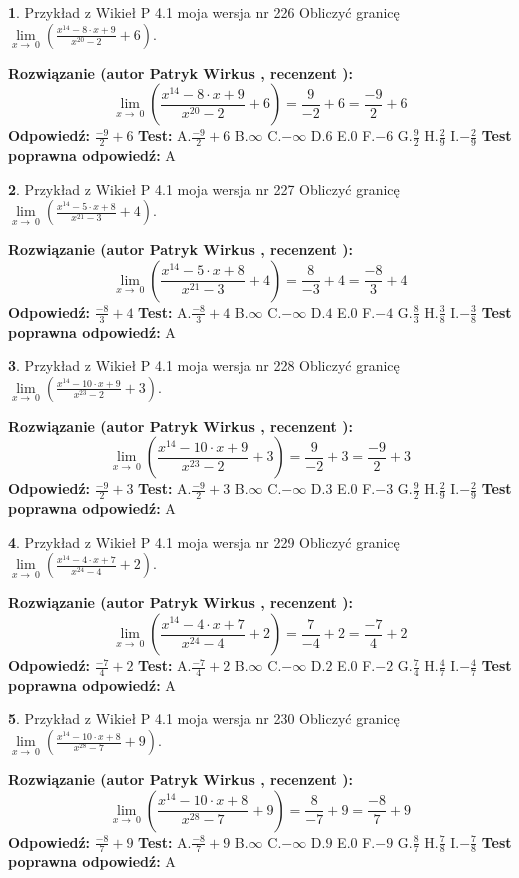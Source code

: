 \documentclass[12pt, a4paper]{article}
\theoremstyle{definition} %
\newtheorem{zad}{}
\newcommand{\zadStart}[1]{\begin{zad}#1\newline}
\newcommand{\zadStop}{\end{zad}}
\newcommand{\rozwStart}[2]{\noindent \textbf{Rozwiązanie (autor #1 , recenzent #2): }\newline}
\newcommand{\rozwStop}{\newline}
\newcommand{\odpStart}{\noindent \textbf{Odpowiedź:}\newline}
\newcommand{\odpStop}{\newline}
\newcommand{\testStart}{\noindent \textbf{Test:}\newline}
\newcommand{\testStop}{\newline}
\newcommand{\kluczStart}{\noindent \textbf{Test poprawna odpowiedź:}\newline}
\newcommand{\kluczStop}{\newline}
\begin{document}
\zadStart{Przykład z Wikieł P 4.1 moja wersja nr 226}
Obliczyć granicę $\lim\limits_{x\to\ 0}(\frac{x^{14}-8 \cdot x +9}{x^{20}-2}+6)$.
\zadStop
\rozwStart{Patryk Wirkus}{}
$$\lim\limits_{x\to\ 0}(\frac{x^{14}-8 \cdot x +9}{x^{20}-2}+6)=\frac{9}{-2}+6=\frac{-9}{2}+6$$
\rozwStop
\odpStart
$\frac{-9}{2}+6$
\odpStop
\testStart
A.$\frac{-9}{2}+6$
B.$\infty$
C.$-\infty$
D.$6$
E.$0$
F.$-6$
G.$\frac{9}{2}$
H.$\frac{2}{9}$
I.$-\frac{2}{9}$
\testStop
\kluczStart
A
\kluczStop



\zadStart{Przykład z Wikieł P 4.1 moja wersja nr 227}
Obliczyć granicę $\lim\limits_{x\to\ 0}(\frac{x^{14}-5 \cdot x +8}{x^{21}-3}+4)$.
\zadStop
\rozwStart{Patryk Wirkus}{}
$$\lim\limits_{x\to\ 0}(\frac{x^{14}-5 \cdot x +8}{x^{21}-3}+4)=\frac{8}{-3}+4=\frac{-8}{3}+4$$
\rozwStop
\odpStart
$\frac{-8}{3}+4$
\odpStop
\testStart
A.$\frac{-8}{3}+4$
B.$\infty$
C.$-\infty$
D.$4$
E.$0$
F.$-4$
G.$\frac{8}{3}$
H.$\frac{3}{8}$
I.$-\frac{3}{8}$
\testStop
\kluczStart
A
\kluczStop



\zadStart{Przykład z Wikieł P 4.1 moja wersja nr 228}
Obliczyć granicę $\lim\limits_{x\to\ 0}(\frac{x^{14}-10 \cdot x +9}{x^{23}-2}+3)$.
\zadStop
\rozwStart{Patryk Wirkus}{}
$$\lim\limits_{x\to\ 0}(\frac{x^{14}-10 \cdot x +9}{x^{23}-2}+3)=\frac{9}{-2}+3=\frac{-9}{2}+3$$
\rozwStop
\odpStart
$\frac{-9}{2}+3$
\odpStop
\testStart
A.$\frac{-9}{2}+3$
B.$\infty$
C.$-\infty$
D.$3$
E.$0$
F.$-3$
G.$\frac{9}{2}$
H.$\frac{2}{9}$
I.$-\frac{2}{9}$
\testStop
\kluczStart
A
\kluczStop



\zadStart{Przykład z Wikieł P 4.1 moja wersja nr 229}
Obliczyć granicę $\lim\limits_{x\to\ 0}(\frac{x^{14}-4 \cdot x +7}{x^{24}-4}+2)$.
\zadStop
\rozwStart{Patryk Wirkus}{}
$$\lim\limits_{x\to\ 0}(\frac{x^{14}-4 \cdot x +7}{x^{24}-4}+2)=\frac{7}{-4}+2=\frac{-7}{4}+2$$
\rozwStop
\odpStart
$\frac{-7}{4}+2$
\odpStop
\testStart
A.$\frac{-7}{4}+2$
B.$\infty$
C.$-\infty$
D.$2$
E.$0$
F.$-2$
G.$\frac{7}{4}$
H.$\frac{4}{7}$
I.$-\frac{4}{7}$
\testStop
\kluczStart
A
\kluczStop



\zadStart{Przykład z Wikieł P 4.1 moja wersja nr 230}
Obliczyć granicę $\lim\limits_{x\to\ 0}(\frac{x^{14}-10 \cdot x +8}{x^{28}-7}+9)$.
\zadStop
\rozwStart{Patryk Wirkus}{}
$$\lim\limits_{x\to\ 0}(\frac{x^{14}-10 \cdot x +8}{x^{28}-7}+9)=\frac{8}{-7}+9=\frac{-8}{7}+9$$
\rozwStop
\odpStart
$\frac{-8}{7}+9$
\odpStop
\testStart
A.$\frac{-8}{7}+9$
B.$\infty$
C.$-\infty$
D.$9$
E.$0$
F.$-9$
G.$\frac{8}{7}$
H.$\frac{7}{8}$
I.$-\frac{7}{8}$
\testStop
\kluczStart
A
\kluczStop
\end{document}
